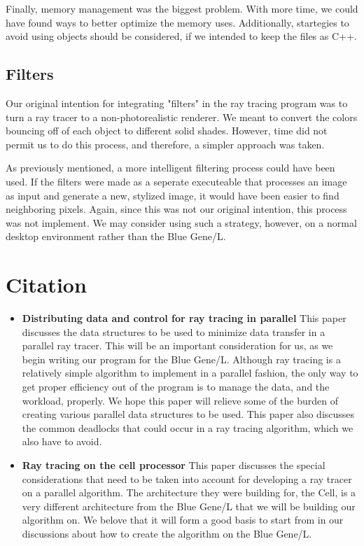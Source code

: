 \documentclass{acmsiggraph}
\begin{document}
Finally, memory management was the biggest problem.  With more time, we could
have found ways to better optimize the memory uses.  Additionally, startegies
to avoid using objects should be considered, if we intended to keep the files as C++.

\subsection{Filters}
Our original intention for integrating "filters" in the ray tracing program
was to turn a ray tracer to a non-photorealistic renderer. We meant to convert the colors
bouncing off of each object to different solid shades.  However, time did not permit
us to do this process, and therefore, a simpler approach was taken.

As previously mentioned, a more intelligent filtering process could have been used.
If the filters were made as a seperate executeable that processes an image
as input and generate a new, stylized image, it would have been easier to find
neighboring pixels.  Again, since this was not our original intention, this process was
not implement.   We may consider using such a strategy, however, on a normal
desktop environment rather than the Blue Gene/L.


\section{Citation}

\begin{itemize}
\item
\textbf{Distributing data and control for ray tracing in parallel} This paper
discusses the data structures to be used to minimize data transfer in a parallel
ray tracer. This will be an important consideration for us, as we begin writing
our program for the Blue Gene/L. Although ray tracing is a relatively
simple algorithm to implement in a parallel fashion, the only way to get proper
efficiency out of the program is to manage the data, and the workload, properly.
We hope this paper will relieve some of the burden of creating various parallel
data structures to be used. This paper also discusses the common deadlocks that
could occur in a ray tracing algorithm, which we also have to
avoid.\cite{badouel1994dda}
\item
\textbf{Ray tracing on the cell processor} This paper discusses the special
considerations that need to be taken into account for developing a ray tracer on
a parallel algorithm. The architecture they were building for, the Cell, is a
very different architecture from the Blue Gene/L that we will be building our algorithm
on. We belove that it will form a good basis to start from in our discussions
about how to create the algorithm on the Blue Gene/L.\cite{benthin2006rtc}
\end{itemize}



\end{document}
